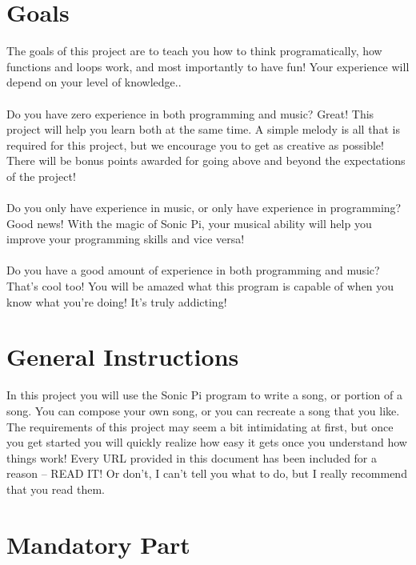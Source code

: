\documentclass{42-en}
\begin{document}
\chapter{Goals}
	The goals of this project are to teach you how to think programatically, how functions and loops work, and most importantly to have fun! Your experience will depend on your level of knowledge..\\
	\\
	Do you have zero experience in both programming and music? Great! This project will help you learn both at the same time. A simple melody is all that is required for this project, but we encourage you to get as creative as possible! There will be bonus points awarded for going above and beyond the expectations of the project!\\
\\
	Do you only have experience in music, or only have experience in programming? Good news! With the magic of Sonic Pi, your musical ability will help you improve your programming skills and vice versa!\\
\\
	Do you have a good amount of experience in both programming and music? That's cool too! You will be amazed what this program is capable of when you know what you're doing! It's truly addicting!

\chapter{General Instructions}
	In this project you will use the Sonic Pi program to write a song, or portion of a song.
	You can compose your own song, or you can recreate a song that you like.
	The requirements of this project may seem a bit intimidating at first, but once you get started you will quickly realize how easy it gets once you understand how things work! Every URL provided in this document has been included for a reason -- READ IT! Or don't, I can't tell you what to do, but I really recommend that you read them.

\chapter{Mandatory Part}
\end{document}
